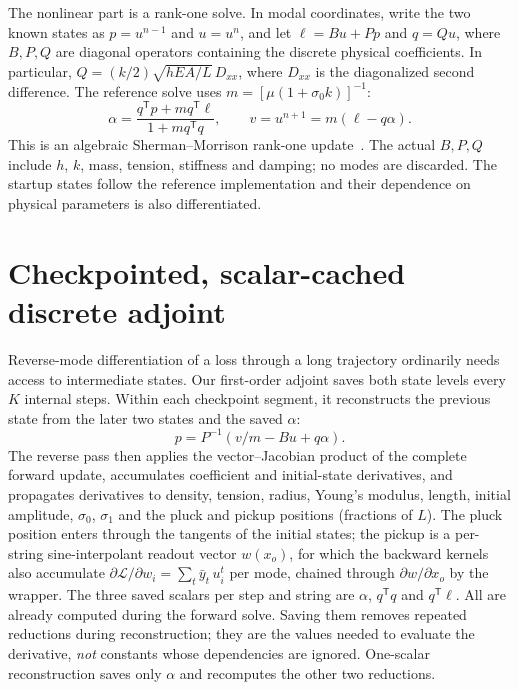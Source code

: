 \documentclass[a4paper,10pt]{article}
\begin{document}
The nonlinear part is a rank-one solve. In modal coordinates, write the two known states as $p=u^{n-1}$ and $u=u^n$, and let $\ell=Bu+Pp$ and $q=Qu$, where $B,P,Q$ are diagonal operators containing the discrete physical coefficients. In particular, $Q=(k/2)\sqrt{hEA/L}\,D_{xx}$, where $D_{xx}$ is the diagonalized second difference. The reference solve uses $m=[\mu(1+\sigma_0k)]^{-1}$:
\begin{equation}
 \alpha=\frac{q^{\mathsf T}p+m q^{\mathsf T}\ell}
                 {1+m q^{\mathsf T}q},\qquad
 v=u^{n+1}=m(\ell-q\alpha).
 \label{eq:step}
\end{equation}
This is an algebraic Sherman--Morrison rank-one update\ \cite{sherman1950}. The actual $B,P,Q$ include $h$, $k$, mass, tension, stiffness and damping; no modes are discarded. The startup states follow the reference implementation and their dependence on physical parameters is also differentiated.

\section{Checkpointed, scalar-cached discrete adjoint}
Reverse-mode differentiation of a loss through a long trajectory ordinarily needs access to intermediate states. Our first-order adjoint saves both state levels every $K$ internal steps. Within each checkpoint segment, it reconstructs the previous state from the later two states and the saved $\alpha$:
\begin{equation}
 p=P^{-1}\!\left(v/m-Bu+q\alpha\right).
 \label{eq:inverse}
\end{equation}
The reverse pass then applies the vector--Jacobian product of the complete forward update, accumulates coefficient and initial-state derivatives, and propagates derivatives to density, tension, radius, Young's modulus, length, initial amplitude, $\sigma_0$, $\sigma_1$ and the pluck and pickup positions (fractions of $L$). The pluck position enters through the tangents of the initial states; the pickup is a per-string sine-interpolant readout vector $w(x_o)$, for which the backward kernels also accumulate $\partial\mathcal{L}/\partial w_i=\sum_t\bar y_t\,u_i^t$ per mode, chained through $\partial w/\partial x_o$ by the wrapper. The three saved scalars per step and string are $\alpha$, $q^{\mathsf T}q$ and $q^{\mathsf T}\ell$. All are already computed during the forward solve. Saving them removes repeated reductions during reconstruction; they are the values needed to evaluate the derivative, \emph{not} constants whose dependencies are ignored. One-scalar reconstruction saves only $\alpha$ and recomputes the other two reductions.
\end{document}
